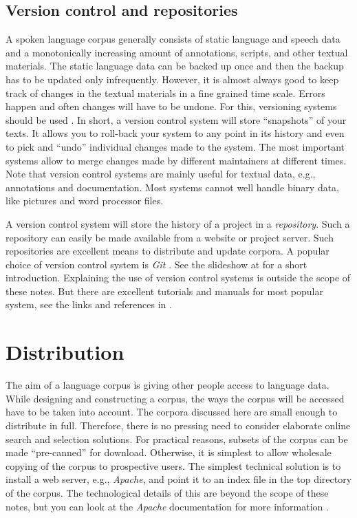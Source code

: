\documentclass[10pt, a4paper]{article}
\begin{document}
\subsection{Version control and repositories}
A spoken language corpus generally consists of static language and speech data and a monotonically increasing amount of annotations, scripts, and other textual materials. The static language data can be backed up once and then the backup has to be updated only infrequently. However, it is almost always good to keep track of changes in the textual materials in a fine grained time scale. Errors happen and often changes will have to be undone. For this, versioning systems should be used \cite{JulieMeloni10}. In short, a version control system will store ``snapshots'' of your texts. It allows you to roll-back your system to any point in its history and even to pick and ``undo'' individual changes made to the system. The most important systems allow to merge changes made by different maintainers at different times. Note that version control systems are mainly useful for textual data, e.g., annotations and documentation. Most systems cannot well handle binary data, like pictures and word processor files.

A version control system will store the history of a project in a \emph{repository}. Such a repository can easily be made available from a website or project server. Such repositories are excellent means to distribute and update corpora. A popular choice of version control system is \emph{Git} \cite{JulieMeloni10}. See the slideshow at \cite{CarterGit2009} for a short introduction. Explaining the use of version control systems is outside the scope of these notes. But there are excellent tutorials and manuals for most popular system, see the links and references in \cite{JulieMeloni10}.

\section{Distribution}\label{Distribution}

The aim of a language corpus is giving other people access to language data. While designing and constructing a corpus, the ways the corpus will be accessed have to be taken into account. The corpora discussed here are small enough to distribute in full. Therefore, there is no pressing need to consider elaborate online search and selection solutions. For practical reasons, subsets of the corpus can be made ``pre-canned'' for download. Otherwise, it is simplest to allow wholesale copying of the corpus to prospective users. The simplest technical solution is to install a web server, e.g., \emph{Apache}, and point it to an index file in the top directory of the corpus. The technological details of this are beyond the scope of these notes, but you can look at the \emph{Apache} documentation for more information \cite{Apache2.4Doc}.
\end{document}
